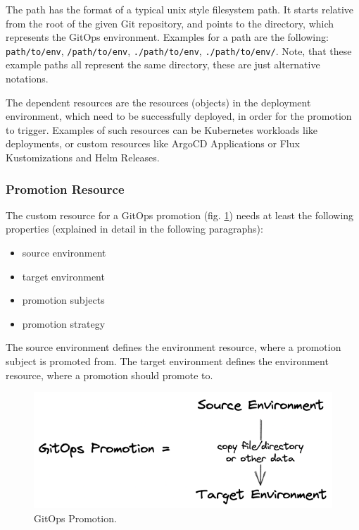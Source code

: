 The path has the format of a typical unix style filesystem path.
It starts relative from the root of the given Git repository,
and points to the directory, which represents the GitOps environment.
Examples for a path are the following:
\lstinline|path/to/env|,
\lstinline|/path/to/env|,
\lstinline|./path/to/env|,
\lstinline|./path/to/env/|.
Note, that these example paths all represent the same directory,
these are just alternative notations.

The dependent resources are the resources (objects) in the deployment environment,
which need to be successfully deployed, in order for the promotion to trigger.
Examples of such resources can be Kubernetes workloads like deployments,
or custom resources like ArgoCD Applications or Flux Kustomizations and Helm Releases.

\subsubsection*{Promotion Resource}

The custom resource for a GitOps promotion
(fig. \ref{fig:gitops-promo})
needs at least the following properties (explained in detail in the following paragraphs):

\begin{itemize}
	\item source environment
	\item target environment
	\item promotion subjects
	\item promotion strategy
\end{itemize}

The source environment defines the environment resource,
where a promotion subject is promoted from.
The target environment defines the environment resource,
where a promotion should promote to.

\begin{figure}[h]
	\centering
	\includegraphics[width=0.70\linewidth]{assets/gitops-promo.png}
	\caption{GitOps Promotion.
	}
	\label{fig:gitops-promo}	
\end{figure}

